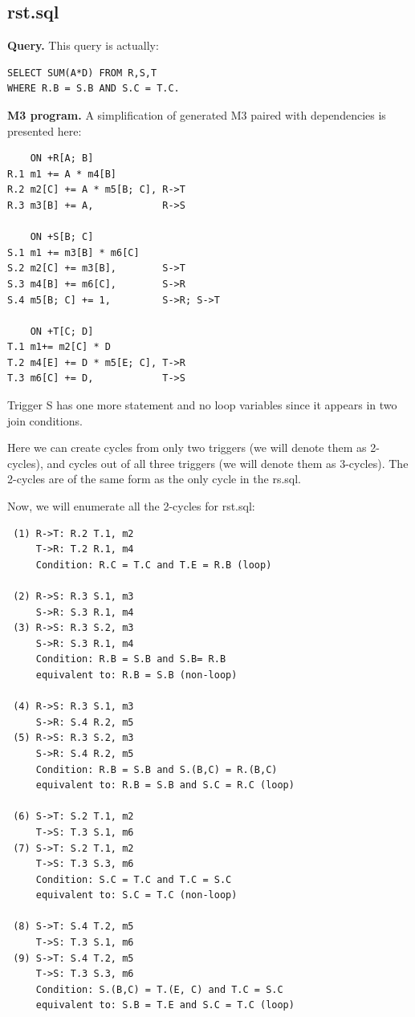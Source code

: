 \documentclass{sig-semester}
\begin{document}
\subsection{rst.sql}
\textbf{Query.} This query is actually:
\begin{verbatim}
SELECT SUM(A*D) FROM R,S,T 
WHERE R.B = S.B AND S.C = T.C.
\end{verbatim}

\textbf{M3 program.} A simplification of generated M3 paired with dependencies is presented here:
\begin{verbatim}
    ON +R[A; B]
R.1 m1 += A * m4[B]
R.2 m2[C] += A * m5[B; C], R->T
R.3 m3[B] += A,            R->S

    ON +S[B; C] 
S.1 m1 += m3[B] * m6[C]
S.2 m2[C] += m3[B],        S->T
S.3 m4[B] += m6[C],        S->R
S.4 m5[B; C] += 1,         S->R; S->T

    ON +T[C; D]
T.1 m1+= m2[C] * D
T.2 m4[E] += D * m5[E; C], T->R
T.3 m6[C] += D,            T->S
\end{verbatim}

Trigger S has one more statement and no loop variables since it appears in two join conditions.

Here we can create cycles from only two triggers (we will denote them as 2-cycles), and cycles out of all three triggers (we will denote them as 3-cycles). The 2-cycles are of the same form as the only cycle in the rs.sql.

Now, we will enumerate all the 2-cycles for rst.sql:
\begin{verbatim}
 (1) R->T: R.2 T.1, m2
     T->R: T.2 R.1, m4
     Condition: R.C = T.C and T.E = R.B (loop)

 (2) R->S: R.3 S.1, m3
     S->R: S.3 R.1, m4
 (3) R->S: R.3 S.2, m3
     S->R: S.3 R.1, m4
     Condition: R.B = S.B and S.B= R.B
     equivalent to: R.B = S.B (non-loop)

 (4) R->S: R.3 S.1, m3
     S->R: S.4 R.2, m5
 (5) R->S: R.3 S.2, m3
     S->R: S.4 R.2, m5
     Condition: R.B = S.B and S.(B,C) = R.(B,C)
     equivalent to: R.B = S.B and S.C = R.C (loop)

 (6) S->T: S.2 T.1, m2
     T->S: T.3 S.1, m6
 (7) S->T: S.2 T.1, m2
     T->S: T.3 S.3, m6
     Condition: S.C = T.C and T.C = S.C
     equivalent to: S.C = T.C (non-loop)

 (8) S->T: S.4 T.2, m5
     T->S: T.3 S.1, m6
 (9) S->T: S.4 T.2, m5
     T->S: T.3 S.3, m6
     Condition: S.(B,C) = T.(E, C) and T.C = S.C
     equivalent to: S.B = T.E and S.C = T.C (loop)
\end{verbatim}
\end{document}
